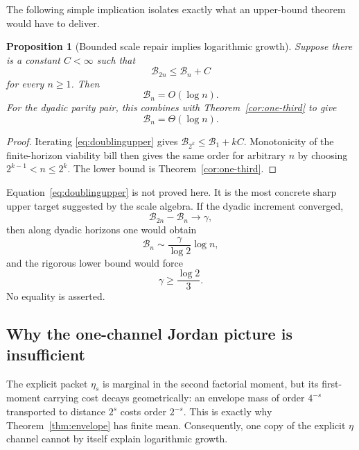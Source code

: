 \documentclass[11pt,a4paper]{article}
\newtheorem{proposition}[theorem]{Proposition}
\theoremstyle{definition}
\theoremstyle{remark}
\newcommand{\cB}{\mathcal B}
\begin{document}
The following simple implication isolates exactly what an upper-bound theorem
would have to deliver.

\begin{proposition}[Bounded scale repair implies logarithmic growth]
\label{prop:boundedscale}
Suppose there is a constant $C<\infty$ such that
\begin{equation}
 \boxed{
 \cB_{2n}\le\cB_n+C
 }
 \label{eq:doublingupper}
\end{equation}
for every $n\ge1$.  Then
\begin{equation}
 \cB_n=O(\log n).
 \label{eq:logupper}
\end{equation}
For the dyadic parity pair, this combines with
Theorem~\ref{cor:one-third} to give
\begin{equation}
 \boxed{\cB_n=\Theta(\log n).}
 \label{eq:theta-log-conditional}
\end{equation}
\end{proposition}

\begin{proof}
Iterating \eqref{eq:doublingupper} gives
$\cB_{2^k}\le\cB_1+kC$.  Monotonicity of the finite-horizon viability bill
then gives the same order for arbitrary $n$ by choosing
$2^{k-1}<n\le2^k$.  The lower bound is Theorem~\ref{cor:one-third}.
\end{proof}

Equation~\eqref{eq:doublingupper} is not proved here.  It is the most concrete
sharp upper target suggested by the scale algebra.  If the dyadic increment
converged,
\[
 \cB_{2n}-\cB_n\longrightarrow\gamma,
\]
then along dyadic horizons one would obtain
\[
 \cB_n\sim\frac{\gamma}{\log2}\log n,
\]
and the rigorous lower bound would force
\begin{equation}
 \gamma\ge\frac{\log2}{3}.
 \label{eq:gammalower}
\end{equation}
No equality is asserted.

\subsection{Why the one-channel Jordan picture is insufficient}

The explicit packet $\eta_s$ is marginal in the second factorial moment, but
its first-moment carrying cost decays geometrically: an envelope mass of order
$4^{-s}$ transported to distance $2^s$ costs order $2^{-s}$.  This is exactly
why Theorem~\ref{thm:envelope} has finite mean.  Consequently, one copy of the
explicit $\eta$ channel cannot by itself explain logarithmic growth.
\end{document}
